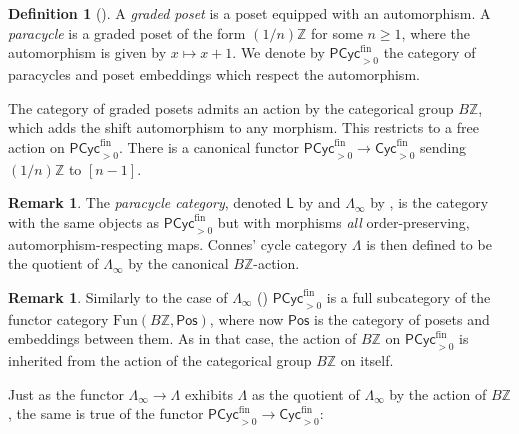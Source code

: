 \documentclass{amsart}
\newcommand{\defterm}[1]{\emph{#1}}
\theoremstyle{plain}
\theoremstyle{definition}
\newtheorem{Def}[thm]{Definition}
\newtheorem{rmk}[thm]{Remark}
\newcommand{\ints}{\mathbb{Z}}
\newcommand{\Fun}{\mathrm{Fun}}
\newcommand{\Cyc}{\mathsf{Cyc}}
\newcommand{\fin}{\mathrm{fin}}
\newcommand{\catdeloop}{B}
\newcommand{\Paracyc}{\mathsf{PCyc}}
\newcommand{\Pos}{\mathsf{Pos}}
\begin{document}
\begin{Def}[\cite{cisinski,nikolaus-scholze}]\label{def:paracyc}
A \defterm{graded poset} is a poset equipped with an automorphism. A \defterm{paracycle} is a graded poset of the form $(1/n)\ints$ for some $n \geq 1$, where the automorphism is given by $x \mapsto x + 1$. We denote by $\Paracyc^\fin_{>0}$ the category of paracycles and poset embeddings which respect the automorphism. 

The category of graded posets admits an action by the categorical group $\catdeloop \ints$, which adds the shift automorphism to any morphism. This restricts to a free action on $\Paracyc^\fin_{>0}$. There is a canonical functor $\Paracyc^\fin_{>0} \to \Cyc^\fin_{>0}$ sending $(1/n)\ints$ to $[n-1]$.
\end{Def}

\begin{rmk}
The \defterm{paracycle category}, denoted $\mathsf{L}$ by \cite{cisinski} and $\Lambda_\infty$ by \cite{nikolaus-scholze}, is the category with the same objects as $\Paracyc^\fin_{>0}$ but with morphisms \emph{all} order-preserving, automorphism-respecting maps. Connes' cycle category $\Lambda$ is then defined to be the quotient of $\Lambda_\infty$ by the canonical $\catdeloop \ints$-action.
\end{rmk}

\begin{rmk}
Similarly to the case of $\Lambda_\infty$ (\cite[Appendix B]{nikolaus-scholze}) $\Paracyc^\fin_{>0}$ is a full subcategory of the functor category $\Fun(\catdeloop \ints, \Pos)$, where now $\Pos$ is the category of posets and embeddings between them. As in that case, the action of $\catdeloop \ints$ on $\Paracyc^\fin_{>0}$ is inherited from the action of the categorical group $\catdeloop \ints$ on itself.
\end{rmk}

Just as the functor $\Lambda_\infty \to \Lambda$ exhibits $\Lambda$ as the quotient of $\Lambda_\infty$ by the action of $\catdeloop \ints$, the same is true of the functor $\Paracyc^\fin_{>0} \to \Cyc^\fin_{>0}$:
\end{document}
